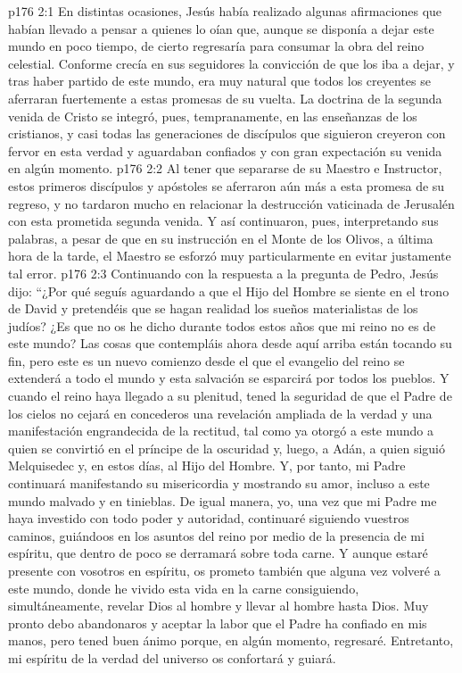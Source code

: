 \vs p176 2:1 En distintas ocasiones, Jesús había realizado algunas afirmaciones que habían llevado a pensar a quienes lo oían que, aunque se disponía a dejar este mundo en poco tiempo, de cierto regresaría para consumar la obra del reino celestial. Conforme crecía en sus seguidores la convicción de que los iba a dejar, y tras haber partido de este mundo, era muy natural que todos los creyentes se aferraran fuertemente a estas promesas de su vuelta. La doctrina de la segunda venida de Cristo se integró, pues, tempranamente, en las enseñanzas de los cristianos, y casi todas las generaciones de discípulos que siguieron creyeron con fervor en esta verdad y aguardaban confiados y con gran expectación su venida en algún momento.
\vs p176 2:2 Al tener que separarse de su Maestro e Instructor, estos primeros discípulos y apóstoles se aferraron aún más a esta promesa de su regreso, y no tardaron mucho en relacionar la destrucción vaticinada de Jerusalén con esta prometida segunda venida. Y así continuaron, pues, interpretando sus palabras, a pesar de que en su instrucción en el Monte de los Olivos, a última hora de la tarde, el Maestro se esforzó muy particularmente en evitar justamente tal error.
\vs p176 2:3 \pc Continuando con la respuesta a la pregunta de Pedro, Jesús dijo: “¿Por qué seguís aguardando a que el Hijo del Hombre se siente en el trono de David y pretendéis que se hagan realidad los sueños materialistas de los judíos? ¿Es que no os he dicho durante todos estos años que mi reino no es de este mundo? Las cosas que contempláis ahora desde aquí arriba están tocando su fin, pero este es un nuevo comienzo desde el que el evangelio del reino se extenderá a todo el mundo y esta salvación se esparcirá por todos los pueblos. Y cuando el reino haya llegado a su plenitud, tened la seguridad de que el Padre de los cielos no cejará en concederos una revelación ampliada de la verdad y una manifestación engrandecida de la rectitud, tal como ya otorgó a este mundo a quien se convirtió en el príncipe de la oscuridad y, luego, a Adán, a quien siguió Melquisedec y, en estos días, al Hijo del Hombre. Y, por tanto, mi Padre continuará manifestando su misericordia y mostrando su amor, incluso a este mundo malvado y en tinieblas. De igual manera, yo, una vez que mi Padre me haya investido con todo poder y autoridad, continuaré siguiendo vuestros caminos, guiándoos en los asuntos del reino por medio de la presencia de mi espíritu, que dentro de poco se derramará sobre toda carne. Y aunque estaré presente con vosotros en espíritu, os prometo también que alguna vez volveré a este mundo, donde he vivido esta vida en la carne consiguiendo, simultáneamente, revelar Dios al hombre y llevar al hombre hasta Dios. Muy pronto debo abandonaros y aceptar la labor que el Padre ha confiado en mis manos, pero tened buen ánimo porque, en algún momento, regresaré. Entretanto, mi espíritu de la verdad del universo os confortará y guiará.
